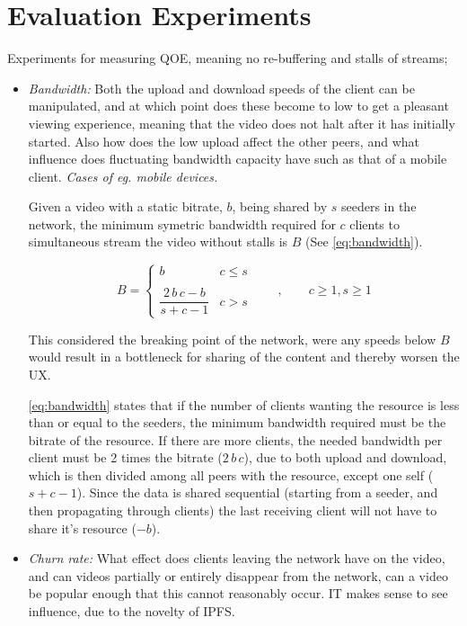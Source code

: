 \section{Evaluation Experiments}
\label{sec:des-evaluation}
Experiments for measuring \ac{QOE}, meaning no re-buffering and stalls of streams;
\begin{itemize}
    \item \textit{Bandwidth:}
    Both the upload and download speeds of the client can be manipulated, and at which point does these become to low to get a pleasant viewing experience, meaning that the video does not halt after it has initially started. Also how does the low upload affect the other peers, and what influence does fluctuating bandwidth capacity have such as that of a mobile client. \textit{Cases of eg. mobile devices.}
    
    Given a video with a static bitrate, $b$, being shared by $s$ seeders in the network, the minimum symetric bandwidth required for $c$ clients to simultaneous stream the video without stalls is $B$ (See \autoref{eq:bandwidth}).
    
    \begin{equation} \label{eq:bandwidth}
        B = 
        \begin{cases}
            b   &   c \leq s
        \\ \\
            \dfrac{2 \, b \, c - b}{s + c - 1}  &  c > s
        \end{cases}
        \qquad , \qquad 
        c \geq 1 ,
        s \geq 1 
    \end{equation}
    
    This considered the breaking point of the network, were any speeds below $B$ would result in a bottleneck for sharing of the content and thereby worsen the \ac{UX}.
    
    \autoref{eq:bandwidth} states that if the number of clients wanting the resource is less than or equal to the seeders, the minimum bandwidth required must be the bitrate of the resource. 
    If there are more clients, the needed bandwidth per client must be 2 times the bitrate ($2 \, b \, c$), due to both upload and download, which is then divided among all peers with the resource, except one self ($s+c-1$).
    Since the data is shared sequential (starting from a seeder, and then propagating through clients) the last receiving client will not have to share it's resource ($-b$). 
    
    \item \textit{Churn rate:}
    What effect does clients leaving the network have on the video, and can videos partially or entirely disappear from the network, can a video be popular enough that this cannot reasonably occur. IT makes sense to see influence, due to the novelty of IPFS.
   

\end{itemize}
